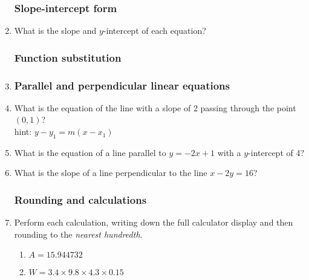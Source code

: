 \documentclass[12pt, twoside]{article}
\begin{document}
\begin{enumerate}
  \subsubsection*{Slope-intercept form}
  \item What is the slope and $y$-intercept of each equation?
\begin{enumerate}[itemsep=2cm]
    \end{enumerate} \vspace{1.5cm}
  
\subsubsection*{Function substitution}
\item 
\begin{enumerate}[itemsep=2cm]
    \end{enumerate}


\newpage
\subsubsection*{Parallel and perpendicular linear equations}

  \item What is the equation of the line with a slope of 2 passing through the point $(0,1)$? \\
  hint: $y-y_1=m(x-x_1)$ \vspace{1.5cm}
  \item What is the equation of a line parallel to $y=-2x+1$ with a $y$-intercept of 4? \vspace{1.5cm}
  \item What is the slope of a line perpendicular to the line $x-2y=16$? \vspace{3cm}

\subsubsection*{Rounding and calculations}
  \item Perform each calculation, writing down the full calculator display and then rounding to the \emph{nearest hundredth}.
    \begin{multicols}{2}
    \begin{enumerate}[itemsep=2cm]
      \item $A=15.944732$
      \item $W=3.4 \times 9.8 \times 4.3 \times 0.15$
            

\end{enumerate}
\end{multicols}
\end{enumerate}
\end{document}

